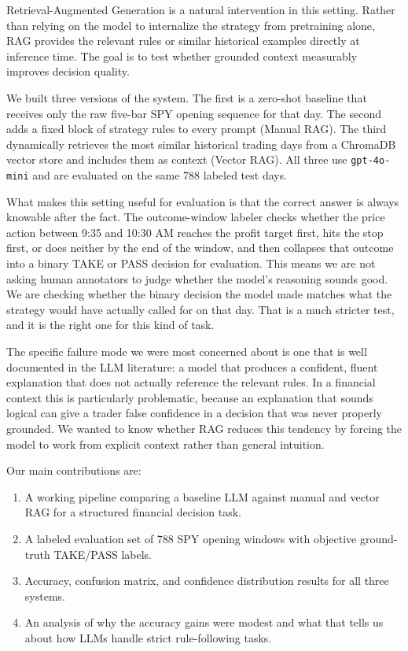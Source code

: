 \documentclass{article}
\begin{document}
Retrieval-Augmented Generation is a natural intervention in this setting. Rather than relying on the model to internalize the strategy from pretraining alone, RAG provides the relevant rules or similar historical examples directly at inference time. The goal is to test whether grounded context measurably improves decision quality.

We built three versions of the system. The first is a zero-shot baseline that receives only the raw five-bar SPY opening sequence for that day. The second adds a fixed block of strategy rules to every prompt (Manual RAG). The third dynamically retrieves the most similar historical trading days from a ChromaDB vector store and includes them as context (Vector RAG). All three use \texttt{gpt-4o-mini} and are evaluated on the same 788 labeled test days.

What makes this setting useful for evaluation is that the correct answer is always knowable after the fact. The outcome-window labeler checks whether the price action between 9:35 and 10:30 AM reaches the profit target first, hits the stop first, or does neither by the end of the window, and then collapses that outcome into a binary TAKE or PASS decision for evaluation. This means we are not asking human annotators to judge whether the model's reasoning sounds good. We are checking whether the binary decision the model made matches what the strategy would have actually called for on that day. That is a much stricter test, and it is the right one for this kind of task.

The specific failure mode we were most concerned about is one that is well documented in the LLM literature: a model that produces a confident, fluent explanation that does not actually reference the relevant rules. In a financial context this is particularly problematic, because an explanation that sounds logical can give a trader false confidence in a decision that was never properly grounded. We wanted to know whether RAG reduces this tendency by forcing the model to work from explicit context rather than general intuition.

Our main contributions are:
\begin{enumerate}
    \item A working pipeline comparing a baseline LLM against manual and vector RAG for a structured financial decision task.
    \item A labeled evaluation set of 788 SPY opening windows with objective ground-truth TAKE/PASS labels.
    \item Accuracy, confusion matrix, and confidence distribution results for all three systems.
    \item An analysis of why the accuracy gains were modest and what that tells us about how LLMs handle strict rule-following tasks.
\end{enumerate}
\end{document}
